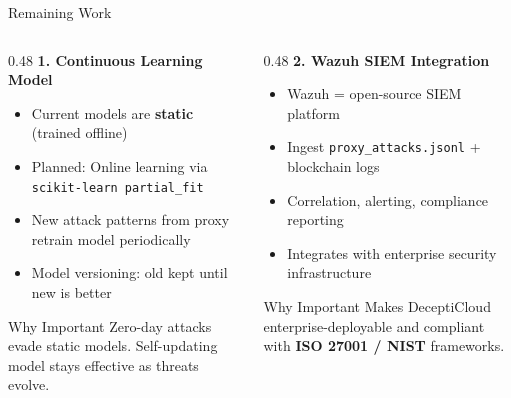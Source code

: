\documentclass[aspectratio=169,12pt]{beamer}
\begin{document}
\begin{frame}{Remaining Work}
  \begin{columns}[T]
    \begin{column}{0.48\textwidth}
      \textbf{\textcolor{dcCyan}{1. Continuous Learning Model}}
      \begin{itemize}\small
        \item Current models are \textbf{static} (trained offline)
        \item Planned: Online learning via \texttt{scikit-learn partial\_fit}
        \item New attack patterns from proxy retrain model periodically
        \item Model versioning: old kept until new is better
      \end{itemize}
      \vspace{0.3em}
      \begin{block}{Why Important}
        \small Zero-day attacks evade static models.
        Self-updating model stays effective as threats evolve.
      \end{block}
    \end{column}
    \begin{column}{0.48\textwidth}
      \textbf{\textcolor{dcYellow}{2. Wazuh SIEM Integration}}
      \begin{itemize}\small
        \item Wazuh = open-source SIEM platform
        \item Ingest \texttt{proxy\_attacks.jsonl} + blockchain logs
        \item Correlation, alerting, compliance reporting
        \item Integrates with enterprise security infrastructure
      \end{itemize}
      \vspace{0.3em}
      \begin{block}{Why Important}
        \small Makes DeceptiCloud enterprise-deployable
        and compliant with \textbf{ISO 27001 / NIST} frameworks.
      \end{block}
    \end{column}
  \end{columns}
\end{frame}
\end{document}
